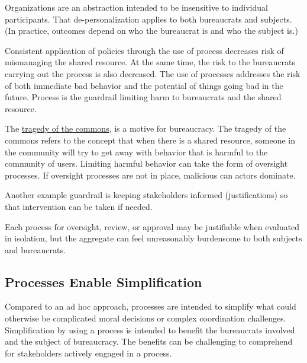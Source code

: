 Organizations are an abstraction intended to be insensitive to individual participants. That de-personalization applies to both bureaucrats and subjects. (In practice, outcomes depend on who the bureaucrat is and who the subject is.) %


Consistent application of policies through the use of process decreases risk of mismanaging the shared resource. At the same time, the risk to the bureaucrats carrying out the process is also decreased.
The use of processes addresses the risk of both immediate bad behavior and the potential of things going bad in the future. Process is the guardrail limiting harm to bureaucrats and the shared resource. 

The \href{https://en.wikipedia.org/wiki/Tragedy_of_the_commons}{tragedy of the commons}, 
is a motive for bureaucracy. 
The tragedy of the commons refers to the concept that when there is a shared resource, someone in the community will try to get away with behavior that is harmful to the community of users. Limiting harmful behavior can take the form of oversight processes. If oversight processes are not in place, malicious can actors dominate.


Another example guardrail is keeping stakeholders informed (justifications) so that intervention can be taken if needed. 

Each process for oversight, review, or approval may be justifiable when evaluated in isolation, but the aggregate can feel unreasonably burdensome to both subjects and bureaucrats.





\subsection*{Processes Enable Simplification}
Compared to an ad hoc approach, processes are intended to simplify what could otherwise be complicated moral decisions or complex coordination challenges. 
Simplification by using a process is intended to benefit the bureaucrats involved and the subject of bureaucracy. The benefits can be challenging to comprehend for stakeholders actively engaged in a process. 


